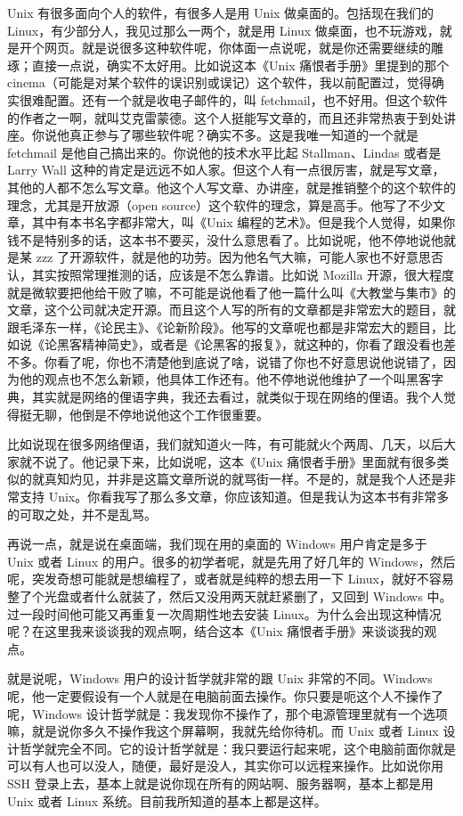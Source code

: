 \documentclass[
  letterpaper,
  DIV=11,
  numbers=noendperiod]{scrreprt}
\begin{document}
Unix 有很多面向个人的软件，有很多人是用 Unix 做桌面的。包括现在我们的
Linux，有少部分人，我见过那么一两个，就是用 Linux
做桌面，也不玩游戏，就是开个网页。就是说很多这种软件呢，你体面一点说呢，就是你还需要继续的雕琢；直接一点说，确实不太好用。比如说这本《Unix
痛恨者手册》里提到的那个
cinema（可能是对某个软件的误识别或误记）这个软件，我以前配置过，觉得确实很难配置。还有一个就是收电子邮件的，叫
fetchmail，也不好用。但这个软件的作者之一啊，就叫艾克雷蒙德。这个人挺能写文章的，而且还非常热衷于到处讲座。你说他真正参与了哪些软件呢？确实不多。这是我唯一知道的一个就是
fetchmail 是他自己搞出来的。你说他的技术水平比起 Stallman、Lindas 或者是
Larry Wall
这种的肯定是远远不如人家。但这个人有一点很厉害，就是写文章，其他的人都不怎么写文章。他这个人写文章、办讲座，就是推销整个的这个软件的理念，尤其是开放源（open
source）这个软件的理念，算是高手。他写了不少文章，其中有本书名字都非常大，叫《Unix
编程的艺术》。但是我个人觉得，如果你钱不是特别多的话，这本书不要买，没什么意思看了。比如说呢，他不停地说他就是某
zzz
了开源软件，就是他的功劳。因为他名气大嘛，可能人家也不好意思否认，其实按照常理推测的话，应该是不怎么靠谱。比如说
Mozilla
开源，很大程度就是微软要把他给干败了嘛，不可能是说他看了他一篇什么叫《大教堂与集市》的文章，这个公司就决定开源。而且这个人写的所有的文章都是非常宏大的题目，就跟毛泽东一样，《论民主》、《论新阶段》。他写的文章呢也都是非常宏大的题目，比如说《论黑客精神简史》，或者是《论黑客的报复》，就这种的，你看了跟没看也差不多。你看了呢，你也不清楚他到底说了啥，说错了你也不好意思说他说错了，因为他的观点也不怎么新颖，他具体工作还有。他不停地说他维护了一个叫黑客字典，其实就是网络的俚语字典，我还去看过，就类似于现在网络的俚语。我个人觉得挺无聊，他倒是不停地说他这个工作很重要。

比如说现在很多网络俚语，我们就知道火一阵，有可能就火个两周、几天，以后大家就不说了。他记录下来，比如说呢，这本《Unix
痛恨者手册》里面就有很多类似的就真知灼见，并非是这篇文章所说的就骂街一样。不是的，就是我个人还是非常支持
Unix。你看我写了那么多文章，你应该知道。但是我认为这本书有非常多的可取之处，并不是乱骂。

再说一点，就是说在桌面端，我们现在用的桌面的 Windows 用户肯定是多于 Unix
或者 Linux 的用户。很多的初学者呢，就是先用了好几年的
Windows，然后呢，突发奇想可能就是想编程了，或者就是纯粹的想去用一下
Linux，就好不容易整了个光盘或者什么就装了，然后又没用两天就赶紧删了，又回到
Windows 中。过一段时间他可能又再重复一次周期性地去安装
Linux。为什么会出现这种情况呢？在这里我来谈谈我的观点啊，结合这本《Unix
痛恨者手册》来谈谈我的观点。

就是说呢，Windows 用户的设计哲学就非常的跟 Unix 非常的不同。Windows
呢，他一定要假设有一个人就是在电脑前面去操作。你只要是呃这个人不操作了呢，Windows
设计哲学就是：我发现你不操作了，那个电源管理里就有一个选项嘛，就是说你多久不操作我这个屏幕啊，我就先给你待机。而
Unix 或者 Linux
设计哲学就完全不同。它的设计哲学就是：我只要运行起来呢，这个电脑前面你就是可以有人也可以没人，随便，最好是没人，其实你可以远程来操作。比如说你用
SSH 登录上去，基本上就是说你现在所有的网站啊、服务器啊，基本上都是用
Unix 或者 Linux 系统。目前我所知道的基本上都是这样。
\end{document}
